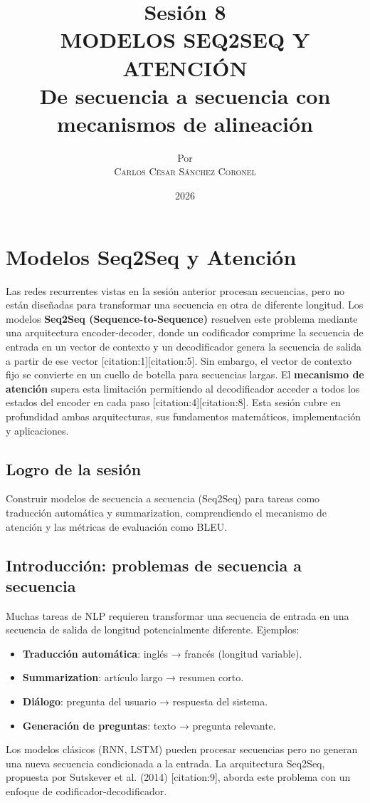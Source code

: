 \documentclass[12pt,a4paper,openany,oneside]{book}
\title{
    \textbf{Sesión 8} \\ 
    \Huge \textbf{MODELOS SEQ2SEQ Y ATENCIÓN} \\
    \Large De secuencia a secuencia con mecanismos de alineación
}
\author{
    \small Por \\ \vspace{0.2cm}
    \Large \textsc{Carlos César Sánchez Coronel}
}
\date{2026}
\begin{document}
\maketitle
\tableofcontents
{}

\chapter{Modelos Seq2Seq y Atención}

Las redes recurrentes vistas en la sesión anterior procesan secuencias, pero no están diseñadas para transformar una secuencia en otra de diferente longitud. Los modelos \textbf{Seq2Seq (Sequence-to-Sequence)} resuelven este problema mediante una arquitectura encoder-decoder, donde un codificador comprime la secuencia de entrada en un vector de contexto y un decodificador genera la secuencia de salida a partir de ese vector [citation:1][citation:5]. Sin embargo, el vector de contexto fijo se convierte en un cuello de botella para secuencias largas. El \textbf{mecanismo de atención} supera esta limitación permitiendo al decodificador acceder a todos los estados del encoder en cada paso [citation:4][citation:8]. Esta sesión cubre en profundidad ambas arquitecturas, sus fundamentos matemáticos, implementación y aplicaciones.

\section{Logro de la sesión}
Construir modelos de secuencia a secuencia (Seq2Seq) para tareas como traducción automática y summarization, comprendiendo el mecanismo de atención y las métricas de evaluación como BLEU.

\section{Introducción: problemas de secuencia a secuencia}
Muchas tareas de NLP requieren transformar una secuencia de entrada en una secuencia de salida de longitud potencialmente diferente. Ejemplos:
\begin{itemize}
    \item \textbf{Traducción automática}: inglés → francés (longitud variable).
    \item \textbf{Summarization}: artículo largo → resumen corto.
    \item \textbf{Diálogo}: pregunta del usuario → respuesta del sistema.
    \item \textbf{Generación de preguntas}: texto → pregunta relevante.
\end{itemize}
Los modelos clásicos (RNN, LSTM) pueden procesar secuencias pero no generan una nueva secuencia condicionada a la entrada. La arquitectura Seq2Seq, propuesta por Sutskever et al. (2014) [citation:9], aborda este problema con un enfoque de codificador-decodificador.
\end{document}

